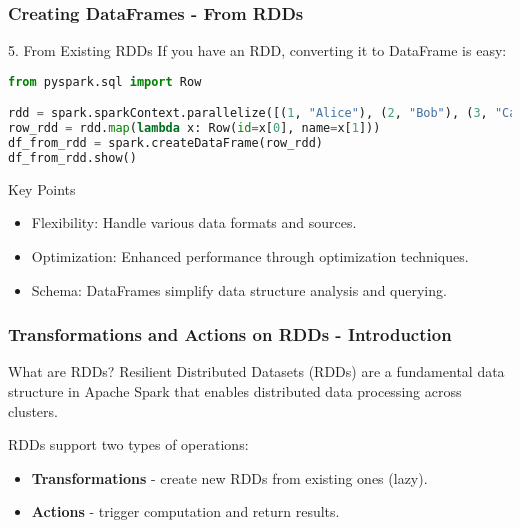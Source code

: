 \documentclass[aspectratio=169]{beamer}
\begin{document}
\begin{frame}[fragile]
    \frametitle{Creating DataFrames - From RDDs}
    \begin{block}{5. From Existing RDDs}
        If you have an RDD, converting it to DataFrame is easy:
        \begin{lstlisting}[language=python]
from pyspark.sql import Row

rdd = spark.sparkContext.parallelize([(1, "Alice"), (2, "Bob"), (3, "Cathy")])
row_rdd = rdd.map(lambda x: Row(id=x[0], name=x[1]))
df_from_rdd = spark.createDataFrame(row_rdd)
df_from_rdd.show()
        \end{lstlisting}
    \end{block}
    
    \begin{block}{Key Points}
        \begin{itemize}
            \item Flexibility: Handle various data formats and sources.
            \item Optimization: Enhanced performance through optimization techniques.
            \item Schema: DataFrames simplify data structure analysis and querying.
        \end{itemize}
    \end{block}
\end{frame}

\begin{frame}[fragile]
    \frametitle{Transformations and Actions on RDDs - Introduction}
    \begin{block}{What are RDDs?}
        Resilient Distributed Datasets (RDDs) are a fundamental data structure in Apache Spark that enables distributed data processing across clusters.
    \end{block}
    RDDs support two types of operations:
    \begin{itemize}
        \item \textbf{Transformations} - create new RDDs from existing ones (lazy).
        \item \textbf{Actions} - trigger computation and return results.
    \end{itemize}
\end{frame}
\end{document}
